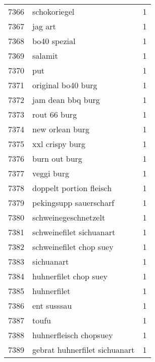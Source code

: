 \begin{tabular}{llr}
7366 &                                       schokoriegel &      1 \\
7367 &                                            jag art &      1 \\
7368 &                                       bo40 spezial &      1 \\
7369 &                                            salamit &      1 \\
7370 &                                                put &      1 \\
7371 &                                 original bo40 burg &      1 \\
7372 &                                  jam dean bbq burg &      1 \\
7373 &                                       rout 66 burg &      1 \\
7374 &                                    new orlean burg &      1 \\
7375 &                                    xxl crispy burg &      1 \\
7376 &                                      burn out burg &      1 \\
7377 &                                         veggi burg &      1 \\
7378 &                            doppelt portion fleisch &      1 \\
7379 &                             pekingsupp sauerscharf &      1 \\
7380 &                               schweinegeschnetzelt &      1 \\
7381 &                           schweinefilet sichuanart &      1 \\
7382 &                            schweinefilet chop suey &      1 \\
7383 &                                         sichuanart &      1 \\
7384 &                              huhnerfilet chop suey &      1 \\
7385 &                                        huhnerfilet &      1 \\
7386 &                                        ent susssau &      1 \\
7387 &                                              toufu &      1 \\
7388 &                             huhnerfleisch chopsuey &      1 \\
7389 &                      gebrat huhnerfilet sichuanart &      1 \\

\end{tabular}

